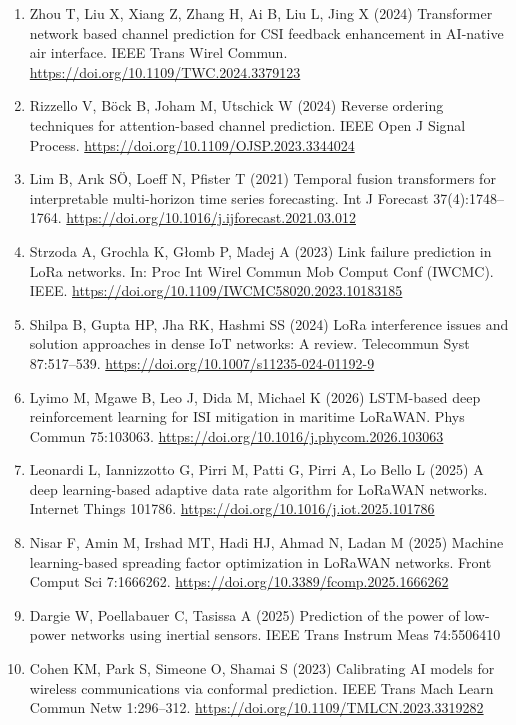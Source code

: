 \documentclass[
  11pt,
]{article}
\begin{document}
\begin{enumerate}
  \url{https://doi.org/10.3389/fmars.2023.1153798}
\item
  Zhou T, Liu X, Xiang Z, Zhang H, Ai B, Liu L, Jing X (2024)
  Transformer network based channel prediction for CSI feedback
  enhancement in AI-native air interface. IEEE Trans Wirel Commun.
  \url{https://doi.org/10.1109/TWC.2024.3379123}
\item
  Rizzello V, Böck B, Joham M, Utschick W (2024) Reverse ordering
  techniques for attention-based channel prediction. IEEE Open J Signal
  Process. \url{https://doi.org/10.1109/OJSP.2023.3344024}
\item
  Lim B, Arık SÖ, Loeff N, Pfister T (2021) Temporal fusion transformers
  for interpretable multi-horizon time series forecasting. Int J
  Forecast 37(4):1748--1764.
  \url{https://doi.org/10.1016/j.ijforecast.2021.03.012}
\item
  Strzoda A, Grochla K, Głomb P, Madej A (2023) Link failure prediction
  in LoRa networks. In: Proc Int Wirel Commun Mob Comput Conf (IWCMC).
  IEEE. \url{https://doi.org/10.1109/IWCMC58020.2023.10183185}
\item
  Shilpa B, Gupta HP, Jha RK, Hashmi SS (2024) LoRa interference issues
  and solution approaches in dense IoT networks: A review. Telecommun
  Syst 87:517--539. \url{https://doi.org/10.1007/s11235-024-01192-9}
\item
  Lyimo M, Mgawe B, Leo J, Dida M, Michael K (2026) LSTM-based deep
  reinforcement learning for ISI mitigation in maritime LoRaWAN. Phys
  Commun 75:103063. \url{https://doi.org/10.1016/j.phycom.2026.103063}
\item
  Leonardi L, Iannizzotto G, Pirri M, Patti G, Pirri A, Lo Bello L
  (2025) A deep learning-based adaptive data rate algorithm for LoRaWAN
  networks. Internet Things 101786.
  \url{https://doi.org/10.1016/j.iot.2025.101786}
\item
  Nisar F, Amin M, Irshad MT, Hadi HJ, Ahmad N, Ladan M (2025) Machine
  learning-based spreading factor optimization in LoRaWAN networks.
  Front Comput Sci 7:1666262.
  \url{https://doi.org/10.3389/fcomp.2025.1666262}
\item
  Dargie W, Poellabauer C, Tasissa A (2025) Prediction of the power of
  low-power networks using inertial sensors. IEEE Trans Instrum Meas
  74:5506410
\item
  Cohen KM, Park S, Simeone O, Shamai S (2023) Calibrating AI models for
  wireless communications via conformal prediction. IEEE Trans Mach
  Learn Commun Netw 1:296--312.
  \url{https://doi.org/10.1109/TMLCN.2023.3319282}

\end{enumerate}
\end{document}
